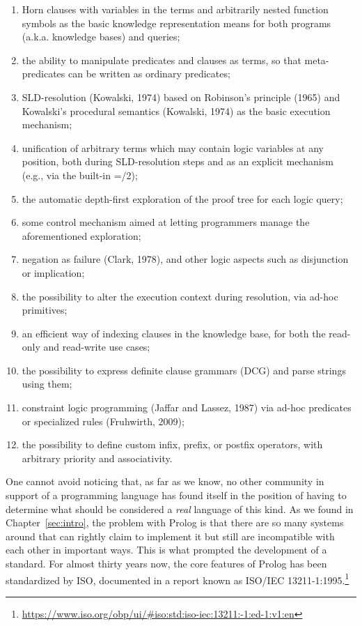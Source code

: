 \begin{enumerate}
\item Horn clauses with variables in the terms and arbitrarily nested function symbols as the basic knowledge representation means for both programs (a.k.a. knowledge bases) and queries;
\item the ability to manipulate predicates and clauses as terms, so that meta-predicates can be written as ordinary predicates;
\item SLD-resolution (Kowalski, 1974) based on Robinson's principle (1965) and Kowalski's procedural semantics (Kowalski, 1974) as the basic execution mechanism; 
\item unification of arbitrary terms which may contain logic variables at any position, both during SLD-resolution steps and as an explicit mechanism (e.g., via the built-in =/2);
\item the automatic depth-first exploration of the proof tree for each logic query;
\item some control mechanism aimed at letting programmers manage the aforementioned exploration;
\item negation as failure (Clark, 1978), and other logic aspects such as disjunction or implication;
\item the possibility to alter the execution context during resolution, via ad-hoc primitives;
\item an efficient way of indexing clauses in the knowledge base, for both the read-only and read-write use cases;
\item the possibility to express definite clause grammars (DCG) and parse strings using them;
\item constraint logic programming (Jaffar and Lassez, 1987) via ad-hoc predicates or specialized rules (Fruhwirth, 2009);
\item the possibility to define custom infix, prefix, or postfix operators, with arbitrary priority and associativity.
\end{enumerate}

\noindent One cannot avoid noticing that, as far as we know, no other community in support of a programming language has found itself in the position of having to determine what should be considered a \textit{real} language of this kind. As we found in Chapter~\ref{sec:intro}, the problem with Prolog is that there are so many systems around that can rightly claim to implement it but still are incompatible with each other in important ways. This is what prompted the development of a standard. For almost thirty years now, the core features of Prolog has been standardized by ISO, documented in a report known as ISO/IEC 13211-1:1995.\footnote{\url{https://www.iso.org/obp/ui/\#iso:std:iso-iec:13211:-1:ed-1:v1:en}}



